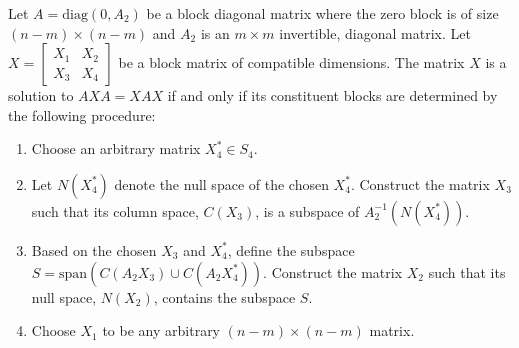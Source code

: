 \documentclass{article}
\begin{document}
\begin{theorem} \label{prop:constructive_solution}
Let $A = \text{diag}(0, A_2)$ be a block diagonal matrix where the zero block is of size $(n - m) \times (n - m)$ and $A_2$ is an $m \times m$ invertible, diagonal matrix.
  Let $X = \begin{bmatrix} X_1 & X_2\\ X_3 & X_4 \end{bmatrix}$ be a block matrix of compatible dimensions.
  The matrix $X$ is a solution to $AXA = XAX$ if and only if its constituent blocks are determined by the following procedure:
  \begin{enumerate}
    \item Choose an arbitrary matrix $X_4^* \in S_4$.
    \item Let $N(X_4^*)$ denote the null space of the chosen $X_4^*$.
      Construct the matrix $X_3$ such that its column space, $C(X_3)$, is a subspace of $A_2^{-1}(N(X_4^*))$.
    \item Based on the chosen $X_3$ and $X_4^*$, define the subspace $S = \text{span}(C(A_2 X_3) \cup C(A_2 X_4^*))$.
      Construct the matrix $X_2$ such that its null space, $N(X_2)$, contains the subspace $S$.
    \item Choose $X_1$ to be any arbitrary $(n - m) \times (n - m)$ matrix.
  \end{enumerate}
\end{theorem}
\end{document}

